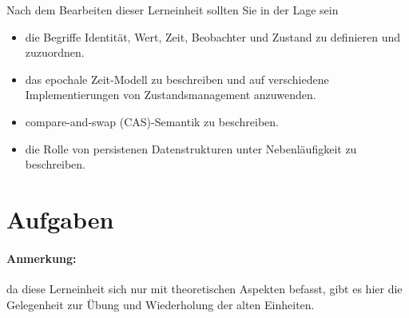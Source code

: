 \documentclass[11pt,a4paper]{article}
\theoremstyle{break}
\begin{document}
Nach dem Bearbeiten dieser Lerneinheit sollten Sie in der Lage sein

\begin{itemize}
    \item die Begriffe Identit\"at, Wert, Zeit, Beobachter und Zustand zu definieren und zuzuordnen.
    \item das epochale Zeit-Modell zu beschreiben und auf verschiedene Implementierungen von Zustandsmanagement anzuwenden.
    \item compare-and-swap (CAS)-Semantik zu beschreiben.
    \item die Rolle von persistenen Datenstrukturen unter Nebenl\"aufigkeit zu beschreiben.
\end{itemize}


\section{Aufgaben}

\paragraph{Anmerkung:} da diese Lerneinheit sich nur mit theoretischen Aspekten befasst, gibt es hier die Gelegenheit zur \"Ubung und Wiederholung der alten Einheiten.
\end{document}
